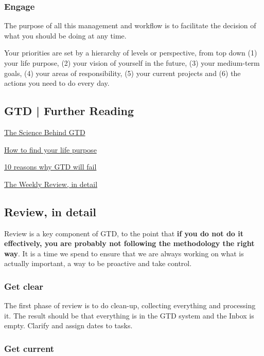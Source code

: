 \subsubsection*{Engage}

The purpose of all this management and workflow is to facilitate the decision of what you should be doing at any time.

Your priorities are set by a hierarchy of levels or perspective, from top down (1) your life purpose, (2) your vision of yourself in the future, (3) your medium-term goals, (4) your areas of responsibility, (5) your current projects and (6) the actions you need to do every day.

\subsection{GTD | Further Reading}

\href{https://facilethings.com/blog/en/science}{The Science Behind GTD}

\href{https://facilethings.com/blog/en/life-purpose}{How to find your life purpose}

\href{https://facilethings.com/blog/en/why-gtd-fails}{10 reasons why GTD will fail}

\href{https://facilethings.com/blog/en/weekly-review}{The Weekly Review, in detail}

\subsection{Review, in detail}

Review is a key component of GTD, to the point that \textbf{if you do not do it effectively, you are probably not following the methodology the right way}. It is a time we spend to ensure that we are always working on what is actually important, a way to be proactive and take control.

\subsubsection*{Get clear}

The first phase of review is to do clean-up, collecting everything and processing it. The result should be that everything is in the GTD system and the Inbox is empty. Clarify and assign dates to tasks.

\subsubsection*{Get current}

